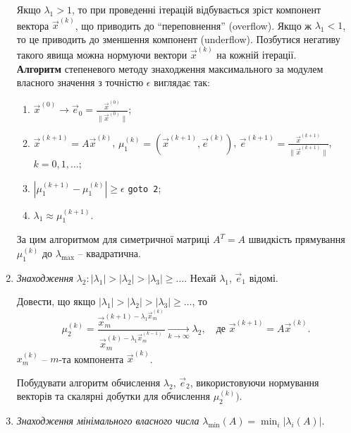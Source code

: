 \begin{enumerate}
	Якщо $\lambda_1 > 1$, то при проведенні ітерацій відбувається зріст компонент вектора $\vec x^{(k)}$, що приводить до ``переповнення'' (overflow). Якщо ж $\lambda_1 < 1$, то це приводить до зменшення компонент (underflow). Позбутися негативу такого явища можна нормуючи вектори $\vec x^{(k)}$ на кожній ітерації. \\

	\textbf{Алгоритм} степеневого методу знаходження максимального за модулем власного значення з точністю $\epsilon$ виглядає так:
	\begin{enumerate}
		\item $\vec x^{(0)} \to \vec e_0 = \frac{\vec x^{(0)}}{\|\vec x^{(0)}\|}$;

		\item $\vec x^{(k+1)} = A \vec x^{(k)}$, $\mu_1^{(k)} = (\vec x^{(k+1)}, \vec e^{(k)})$, $\vec e^{(k+1)} = \frac{\vec x^{(k+1)}}{\|\vec x^{(k+1)}\|}$, $k = 0,1,\ldots$;

		\item $|\mu_1^{(k+1)} - \mu_1^{(k)}| \ge \epsilon$ \verb|goto 2|;

		\item $\lambda_1 \approx \mu_1^{(k+1)}$.
	\end{enumerate}

	За цим алгоритмом для симетричної матриці $A^T = A$ швидкість прямування $\mu_1^{(k)}$ до $\lambda_{\max}$ -- квадратична.

	\item \textit{Знаходження} $\lambda_2: |\lambda_1| > |\lambda_2| > |\lambda_3| \ge \ldots$. Нехай $\lambda_1$, $\vec e_1$ відомі.

	\begin{problem}
		Довести, що якщо $|\lambda_1| > |\lambda_2| > |\lambda_3| \ge \ldots$, то
		\[ \mu_2^{(k)} = \dfrac{\vec x_m^{(k+1) - \lambda_1 \vec x_m^{(k)}}}{\vec x_m^{(k) - \lambda_1 \vec x_m^{(k-1)}}} \xrightarrow[k\to\infty]{} \lambda_2, \quad \text{де } \vec x^{(k+1)} = A \vec x^{(k)}. \]
		$x_m^{(k)}$ -- $m$-та компонента $\vec x^{(k)}$.
	\end{problem}

	\begin{problem}
		Побудувати алгоритм обчислення $\lambda_2$, $\vec e_2$, використовуючи нормування векторів та скалярні добутки для обчислення $\mu_2^{(k)})$.
	\end{problem}	

	\item \textit{Знаходження мінімального власного числа} $\lambda_{\min}(A) = \min_i |\lambda_i(A)|$.


\end{enumerate}
